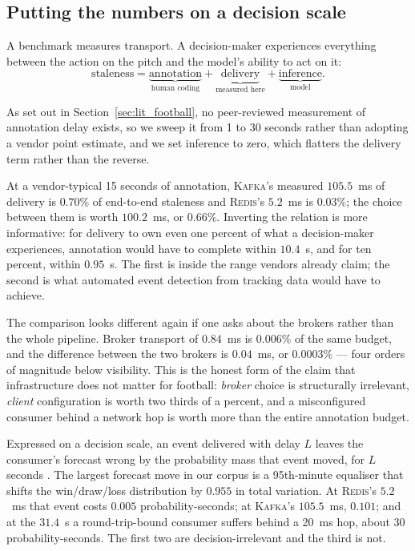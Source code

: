 \documentclass[Afour,sageh,times]{sagej}
\newcommand{\redis}{\textsc{Redis}}
\newcommand{\kafka}{\textsc{Kafka}}
\begin{document}
\subsection{Putting the numbers on a decision scale}
\label{sec:budget}

A benchmark measures transport. A decision-maker experiences everything between the action on the
pitch and the model's ability to act on it:
\[
  \text{staleness} = \underbrace{\text{annotation}}_{\text{human coding}}
  + \underbrace{\text{delivery}}_{\text{measured here}}
  + \underbrace{\text{inference}}_{\text{model}} .
\]

As set out in Section~\ref{sec:lit_football}, no peer-reviewed measurement of annotation delay
exists, so we sweep it from 1 to 30 seconds rather than adopting a vendor point estimate, and we
set inference to zero, which flatters the delivery term rather than the reverse.

At a vendor-typical 15 seconds of annotation, \kafka{}'s measured $105.5$~ms of delivery is
$0.70\%$ of end-to-end staleness and \redis{}'s $5.2$~ms is $0.03\%$; the choice between them is
worth $100.2$~ms, or $\mathbf{0.66\%}$. Inverting the relation is more informative: for delivery
to own even one percent of what a decision-maker experiences, annotation would have to complete
within $10.4$~s, and for ten percent, within $0.95$~s. The first is inside the range vendors
already claim; the second is what automated event detection from tracking data would have to
achieve.

The comparison looks different again if one asks about the brokers rather than the whole pipeline.
Broker transport of $0.84$~ms is $0.006\%$ of the same budget, and the difference between the two
brokers is $0.04$~ms, or $0.0003\%$ --- four orders of magnitude below visibility. This is the
honest form of the claim that infrastructure does not matter for football: \emph{broker} choice is
structurally irrelevant, \emph{client} configuration is worth two thirds of a percent, and a
misconfigured consumer behind a network hop is worth more than the entire annotation budget.

Expressed on a decision scale, an event delivered with delay $L$ leaves the consumer's forecast
wrong by the probability mass that event moved, for $L$ seconds \cite{kaul2012realtime}. The
largest forecast move in our corpus is a 95th-minute equaliser that shifts the win/draw/loss
distribution by $0.955$ in total variation. At \redis{}'s $5.2$~ms that event costs $0.005$
probability-seconds; at \kafka{}'s $105.5$~ms, $0.101$; and at the $31.4$~s a round-trip-bound
consumer suffers behind a 20~ms hop, about $30$ probability-seconds. The first two are
decision-irrelevant and the third is not.
\end{document}
